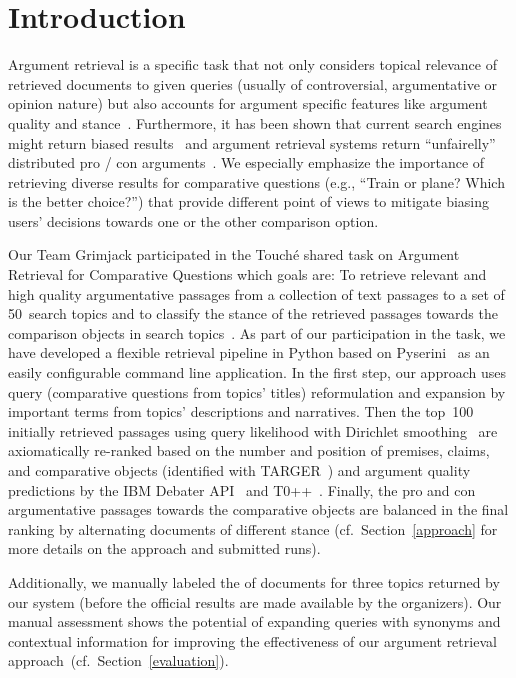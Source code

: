 \section{Introduction}\label{intro}

Argument retrieval is a specific task that not only considers topical relevance of retrieved documents to given queries (usually of controversial, argumentative or opinion nature) but also accounts for argument specific features like argument quality and stance~\cite{BondarenkoFBGAPBSWPH2020, BondarenkoGFBAPBSWPH2021}.  
Furthermore, it has been shown that current search engines might return biased results~\cite{ShahB2022} and argument retrieval systems return ``unfairelly'' distributed pro / con arguments~\cite{CherumanalSSC2021}.
We especially emphasize the importance of retrieving diverse results for comparative questions (e.g., ``Train or plane? Which is the better choice?'') that provide different point of views to mitigate biasing users' decisions towards one or the other comparison option.

Our Team Grimjack participated in the Touch{\'e} shared task on Argument Retrieval for Comparative Questions which goals are: \Ni To retrieve relevant and high quality argumentative passages from a collection of  text passages to a set of 50~search topics and \Nii to classify the stance of the retrieved passages towards the comparison objects in search topics~\cite{BondarenkoFKSGBPBSWPH2022}.
As part of our participation in the task, we have developed a flexible retrieval pipeline in Python based on Pyserini~\cite{LinMLYPN2021} as an easily configurable command line application.
In the first step, our approach uses query (comparative questions from topics' titles) reformulation and expansion by important terms from topics' descriptions and narratives. Then the top~100 initially retrieved passages using query likelihood with Dirichlet smoothing~\cite{ZhaiL2001} are axiomatically re-ranked based on the number and position of premises, claims, and comparative objects (identified with TARGER~\cite{ChernodubOHBHBP2019}) and argument quality predictions by the IBM Debater API~\cite{ToledoGCFVLJAS2019} and T0++~\cite{SanhWRBSACSLRDBXTSSKCNDCJWMSYPBWNRSSFFTBGBWR2021}.
Finally, the pro and con argumentative passages towards the comparative objects are balanced in the final ranking by alternating documents of different stance (cf.\ Section~\ref{approach} for more details on the approach and submitted runs).

Additionally, we manually labeled the  of  documents for three topics returned by our system (before the official results are made available by the organizers). Our manual assessment shows the potential of expanding queries with synonyms and contextual information for improving the effectiveness of our argument retrieval approach~(cf.\ Section~\ref{evaluation}).

